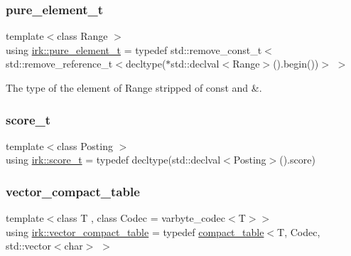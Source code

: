\subsubsection{\texorpdfstring{pure\+\_\+element\+\_\+t}{pure\_element\_t}}
{\footnotesize\ttfamily template$<$class Range $>$ \\
using \mbox{\hyperlink{namespaceirk_a1e48b43a3f40d553264380da5e7263c1}{irk\+::pure\+\_\+element\+\_\+t}} = typedef std\+::remove\+\_\+const\+\_\+t$<$ std\+::remove\+\_\+reference\+\_\+t$<$decltype($\ast$std\+::declval$<$Range$>$().begin())$>$ $>$}



The type of the element of Range stripped of {\ttfamily const} and {\ttfamily \&}. 

\mbox{\label{namespaceirk_a87bce44d1e3fdff0b1b3bb78f2a5f924}} 
\subsubsection{\texorpdfstring{score\+\_\+t}{score\_t}}
{\footnotesize\ttfamily template$<$class Posting $>$ \\
using \mbox{\hyperlink{namespaceirk_a87bce44d1e3fdff0b1b3bb78f2a5f924}{irk\+::score\+\_\+t}} = typedef decltype(std\+::declval$<$Posting$>$().score)}

\mbox{\label{namespaceirk_a34b2e9b780a3b5d4532d7975d6c1a8bf}} 
\subsubsection{\texorpdfstring{vector\+\_\+compact\+\_\+table}{vector\_compact\_table}}
{\footnotesize\ttfamily template$<$class T , class Codec  = varbyte\+\_\+codec$<$\+T$>$$>$ \\
using \mbox{\hyperlink{namespaceirk_a34b2e9b780a3b5d4532d7975d6c1a8bf}{irk\+::vector\+\_\+compact\+\_\+table}} = typedef \mbox{\hyperlink{classirk_1_1compact__table}{compact\+\_\+table}}$<$T, Codec, std\+::vector$<$char$>$ $>$}

\mbox{\label{namespaceirk_a6d042444ebc87e3036291ec5656b0c51}} 

